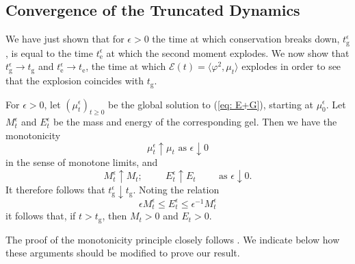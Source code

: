 \subsection{Convergence of the Truncated Dynamics}
We have just shown that for $\epsilon > 0$ the time at which conservation breaks down, $t_\mathrm{g}^\epsilon$, is equal to the time $t_\mathrm{e}^\epsilon$ at which the second moment explodes.
We now show that $t_\mathrm{g}^\epsilon \rightarrow t_\mathrm{g}$ and $t_\mathrm{e}^\epsilon \rightarrow t_\mathrm{e}$, the time at which $\mathcal{E}(t)=\langle \varphi^2, \mu_t\rangle$ explodes in order to see that the explosion coincides with $t_\mathrm{g}$.
\begin{lemma}\label{lemma: connecting mu-epsilon and mu}
    For $\epsilon>0$, let $(\mu^\epsilon_t)_{t\geq 0}$ be the global solution to (\ref{eq: E+G}), starting at $\mu_0^\epsilon.$ Let $M^\epsilon_t$ and $E^\epsilon_t$ be the mass and energy of the corresponding gel. Then we have  the monotonicity \begin{equation}\label{eq: monontonicity for muepsilont}
        \mu^\epsilon_t \uparrow \mu_t \text{ as }\epsilon\downarrow 0
    \end{equation} in the sense of monotone limits, and\begin{equation} \label{eq: monotonicity for gel data}
        M^\epsilon_t \uparrow M_t; \hspace{1cm} E^\epsilon_t \uparrow E_t \hspace{1cm} \text{as }\epsilon\downarrow 0.
    \end{equation}
It therefore follows that $t^\epsilon_\mathrm{g}\downarrow t_\mathrm{g}$. Noting the relation \begin{equation}\label{eq: Mepsilon and Eepsilon}
        \epsilon M^\epsilon_t \leq E^\epsilon_t \leq \epsilon^{-1}M^\epsilon_t
    \end{equation}it follows that, if $t>t_\mathrm{g}$, then $M_t >0$ and $E_t>0$.
\end{lemma}
The proof of the monotonicity principle closely follows \cite[Propositions 2.4,  2.7]{N00}. We indicate below how these arguments should be modified to prove our result.
